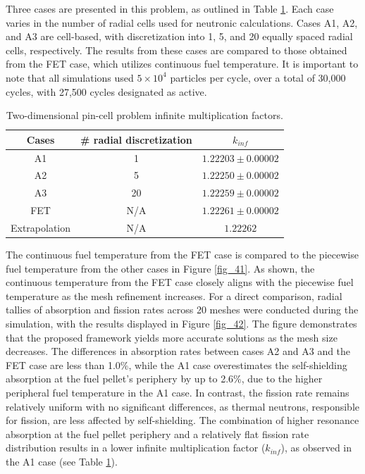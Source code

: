 Three cases are presented in this problem, as outlined in Table \ref{tab2}. Each case varies in the number of radial cells used for neutronic calculations. Cases A1, A2, and A3 are cell-based, with discretization into 1, 5, and 20 equally spaced radial cells, respectively. The results from these cases are compared to those obtained from the FET case, which utilizes continuous fuel temperature. It is important to note that all simulations used $5\times10^4$ particles per cycle, over a total of 30,000 cycles, with 27,500 cycles designated as active.
\begin{table}
    \centering
    \caption{Two-dimensional pin-cell problem infinite multiplication factors.}
    \label{tab2} 
    \begin{tabular}{| c | c | c | }
    \hline 
     Cases & \# radial discretization & $k_{inf}$ \\
     \hline
     A1     & 1   & $1.22203\pm0.00002$      \\ \hline
     A2     & 5   & $1.22250\pm0.00002$      \\ \hline
     A3     & 20  & $1.22259\pm0.00002$      \\ \hline
     FET    & N/A & $1.22261\pm0.00002$      \\ \hline
     Extrapolation    & N/A & $1.22262$      \\ \hline
    \end{tabular}
\end{table}

The continuous fuel temperature from the FET case is compared to the piecewise fuel temperature from the other cases in Figure \ref{fig_41}. As shown, the continuous temperature from the FET case closely aligns with the piecewise fuel temperature as the mesh refinement increases. For a direct comparison, radial tallies of absorption and fission rates across 20 meshes were conducted during the simulation, with the results displayed in Figure \ref{fig_42}. The figure demonstrates that the proposed framework yields more accurate solutions as the mesh size decreases. The differences in absorption rates between cases A2 and A3 and the FET case are less than 1.0\%, while the A1 case overestimates the self-shielding absorption at the fuel pellet's periphery by up to 2.6\%, due to the higher peripheral fuel temperature in the A1 case. In contrast, the fission rate remains relatively uniform with no significant differences, as thermal neutrons, responsible for fission, are less affected by self-shielding. The combination of higher resonance absorption at the fuel pellet periphery and a relatively flat fission rate distribution results in a lower infinite multiplication factor ($k_{inf}$), as observed in the A1 case (see Table \ref{tab2}).

